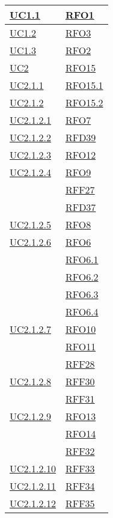 \begin{longtable}{|>{\centering}m{5cm}|m{5cm}<{\centering}|}
	\hyperref[UC1.1]{UC1.1} & \hyperlink{RFO1}{RFO1}\\ \hline
	\hyperref[UC1.2]{UC1.2} & \hyperlink{RFO3}{RFO3}\\ \hline
	\hyperref[UC1.3]{UC1.3} & \hyperlink{RFO2}{RFO2}\\ \hline
	\hyperref[UC2]{UC2} & \hyperlink{RFO15}{RFO15}\\ \hline
	\hyperref[UC2.1.1]{UC2.1.1} & \hyperlink{RFO15.1}{RFO15.1}\\ \hline
	\hyperref[UC2.1.2]{UC2.1.2} & \hyperlink{RFO15.2}{RFO15.2}\\ \hline
	\hyperref[UC2.1.2.1]{UC2.1.2.1} & \hyperlink{RFO7}{RFO7}\\ \hline
	\hyperref[UC2.1.2.2]{UC2.1.2.2} & \hyperlink{RFD39}{RFD39}\\ \hline
	\hyperref[UC2.1.2.3]{UC2.1.2.3} & \hyperlink{RFO12}{RFO12}\\ \hline
	\hyperref[UC2.1.2.4]{UC2.1.2.4} & \hyperlink{RFO9}{RFO9}\\
	& \hyperlink{RFF27}{RFF27}\\
	& \hyperlink{RFD37}{RFD37}\\ \hline
	\hyperref[UC2.1.2.5]{UC2.1.2.5} & \hyperlink{RFO8}{RFO8}\\ \hline
	\hyperref[UC2.1.2.6]{UC2.1.2.6} & \hyperlink{RFO6}{RFO6}\\
	& \hyperlink{RFO6.1}{RFO6.1}\\
	& \hyperlink{RFO6.2}{RFO6.2}\\
	& \hyperlink{RFO6.3}{RFO6.3}\\
	& \hyperlink{RFO6.4}{RFO6.4}\\ \hline
	\hyperref[UC2.1.2.7]{UC2.1.2.7} & \hyperlink{RFO10}{RFO10}\\
	& \hyperlink{RFO11}{RFO11}\\
	& \hyperlink{RFF28}{RFF28}\\ \hline
	\hyperref[UC2.1.2.8]{UC2.1.2.8} & \hyperlink{RFF30}{RFF30}\\
	& \hyperlink{RFF31}{RFF31}\\ \hline
	\hyperref[UC2.1.2.9]{UC2.1.2.9} & \hyperlink{RFO13}{RFO13}\\
	& \hyperlink{RFO14}{RFO14}\\
	& \hyperlink{RFF32}{RFF32}\\ \hline
	\hyperref[UC2.1.2.10]{UC2.1.2.10} & \hyperlink{RFF33}{RFF33}\\ \hline
	\hyperref[UC2.1.2.11]{UC2.1.2.11} & \hyperlink{RFF34}{RFF34}\\ \hline
	\hyperref[UC2.1.2.12]{UC2.1.2.12} & \hyperlink{RFF35}{RFF35}\\ \hline

\end{longtable}
